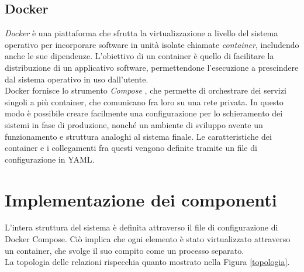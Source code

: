 \subsection{Docker}
\textit{Docker} \cite{docker_doc} è una piattaforma che sfrutta la virtualizzazione a livello del sistema operativo per incorporare software 
in unità isolate chiamate \textit{container}, includendo anche le sue dipendenze. L'obiettivo di un container è quello di 
facilitare la distribuzione di un applicativo software, permettendone l'esecuzione a prescindere dal sistema operativo 
in uso dall'utente. 
\\ Docker fornisce lo strumento \textit{Compose} \cite{docker_comp}, che permette di orchestrare dei servizi singoli a più container, 
che comunicano fra loro su una rete privata. In questo modo è possibile creare facilmente una configurazione per lo schieramento dei sistemi in fase di produzione, 
nonché un ambiente di sviluppo avente 
un funzionamento e struttura analoghi al sistema finale. Le caratteristiche dei container e i collegamenti fra questi
 vengono definite tramite un file di configurazione in YAML. 


\section{Implementazione dei componenti}
L'intera struttura del sistema è definita attraverso il file di configurazione di Docker Compose. Ciò implica che ogni 
elemento è stato virtualizzato attraverso un container, che svolge il suo compito come un processo separato. 
\\ La topologia delle relazioni rispecchia quanto mostrato nella Figura \ref*{topologia}. 


